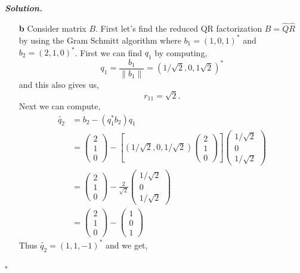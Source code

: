 \documentclass[12pt]{report}
\newenvironment{solution}[1][\it{Solution}]{\textbf{#1. } }{$\square$}
\begin{document}
\begin{solution}
\begin{enumerate}
        \item [{\bf b}] Consider matrix $B$. First let's find the reduced QR factorization $B = \hat{Q}\hat{R}$ by using the Gram Schmitt algorithm where $b_1 = (1,0,1)^*$ and $b_2 = (2,1,0)^*$. First we can find $q_1$ by computing,
        \[ 
            q_1 = \frac{b_1}{\|b_1\|} = (1/\sqrt{2}, 0, 1\sqrt{2})^*
        \]
        and this also gives us,
        \[
            r_{11} = \sqrt{2}.
        \]
        Next we can compute,
        \begin{align*}
            \tilde{q_2} &= b_2 - (q_1^*b_2)q_1\\
            &= \begin{pmatrix}
                2\\1\\0
            \end{pmatrix} - \left[ \left(1/\sqrt{2}, 0 ,1/\sqrt{2} \right) \begin{pmatrix} 2\\1\\0 \end{pmatrix}\right]\begin{pmatrix}
                1/\sqrt{2}\\
                0\\
                1/\sqrt{2}
            \end{pmatrix}\\
            &= \begin{pmatrix}
                2\\1\\0
            \end{pmatrix} - \frac{2}{\sqrt{2}}\begin{pmatrix}
                1/\sqrt{2}\\
                0\\
                1/\sqrt{2}
            \end{pmatrix}\\
            &= \begin{pmatrix}
                2\\1\\0
            \end{pmatrix} - \begin{pmatrix}
                1\\
                0\\
                1
            \end{pmatrix}
        \end{align*}
        Thus $\tilde{q_2} = (1,1,-1)^*$ and we get,

\end{enumerate}
\end{solution}
\end{document}

